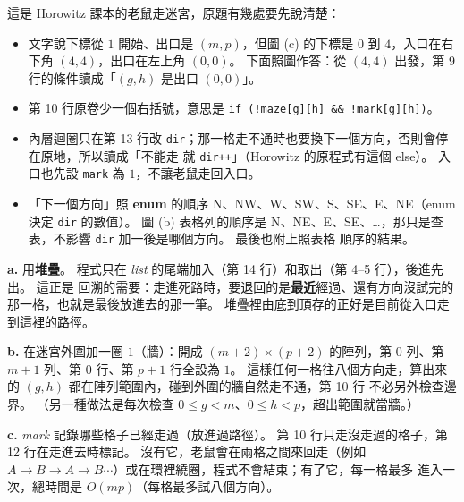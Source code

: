 \begin{pastsoln}
這是 Horowitz 課本的老鼠走迷宮，原題有幾處要先說清楚：
\begin{itemize}
\item 文字說下標從 $1$ 開始、出口是 $(m, p)$，但圖 (c) 的下標是 $0$ 到 $4$，入口在右下角 $(4, 4)$，出口在左上角
$(0, 0)$。 下面照圖作答：從 $(4, 4)$ 出發，第 9 行的條件讀成「$(g, h)$ 是出口 $(0, 0)$」。
\item 第 10 行原卷少一個右括號，意思是 \texttt{if (!maze[g][h] \&\& !mark[g][h])}。
\item 內層迴圈只在第 13 行改 \texttt{dir}；那一格走不通時也要換下一個方向，否則會停在原地，所以讀成「不能走
就 \texttt{dir++}」（Horowitz 的原程式有這個 else）。 入口也先設 \texttt{mark} 為 $1$，不讓老鼠走回入口。
\item 「下一個方向」照 \textbf{enum} 的順序 N、NW、W、SW、S、SE、E、NE（enum 決定 \texttt{dir} 的數值）。
圖 (b) 表格列的順序是 N、NE、E、SE、…，那只是查表，不影響 \texttt{dir} 加一後是哪個方向。 最後也附上照表格
順序的結果。
\end{itemize}

\textbf{a.} 用\textbf{堆疊}。 程式只在 \textit{list} 的尾端加入（第 14 行）和取出（第 4--5 行），後進先出。 這正是
回溯的需要：走進死路時，要退回的是\textbf{最近}經過、還有方向沒試完的那一格，也就是最後放進去的那一筆。
堆疊裡由底到頂存的正好是目前從入口走到這裡的路徑。

\textbf{b.} 在迷宮外圍加一圈 $1$（牆）：開成 $(m+2) \times (p+2)$ 的陣列，第 $0$ 列、第 $m+1$ 列、第 $0$ 行、第 $p+1$
行全設為 $1$。 這樣任何一格往八個方向走，算出來的 $(g, h)$ 都在陣列範圍內，碰到外圍的牆自然走不通，第 10 行
不必另外檢查邊界。 （另一種做法是每次檢查 $0 \le g < m$、$0 \le h < p$，超出範圍就當牆。）

\textbf{c.} \textit{mark} 記錄哪些格子已經走過（放進過路徑）。 第 10 行只走沒走過的格子，第 12 行在走進去時標記。
沒有它，老鼠會在兩格之間來回走（例如 $A \to B \to A \to B \cdots$）或在環裡繞圈，程式不會結束；有了它，每一格最多
進入一次，總時間是 $O(mp)$（每格最多試八個方向）。


\end{pastsoln}
